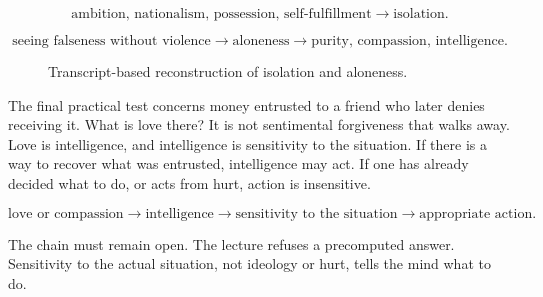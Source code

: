 \documentclass[11pt,oneside]{book}
\begin{document}
\begin{equation}
\text{ambition, nationalism, possession, self-fulfillment}
\longrightarrow
\text{isolation}.
\end{equation}

\begin{equation}
\text{seeing falseness without violence}
\longrightarrow
\text{aloneness}
\longrightarrow
\text{purity, compassion, intelligence}.
\end{equation}

\begin{figure}
\centering
{}

Transcript-based reconstruction of isolation and aloneness.
\end{figure}

The final practical test concerns money entrusted to a friend who later denies receiving it. What is love there? It is not sentimental forgiveness that walks away. Love is intelligence, and intelligence is sensitivity to the situation. If there is a way to recover what was entrusted, intelligence may act. If one has already decided what to do, or acts from hurt, action is insensitive.

\begin{equation}
\text{love or compassion}
\longrightarrow
\text{intelligence}
\longrightarrow
\text{sensitivity to the situation}
\longrightarrow
\text{appropriate action}.
\end{equation}

The chain must remain open. The lecture refuses a precomputed answer. Sensitivity to the actual situation, not ideology or hurt, tells the mind what to do.
\end{document}
